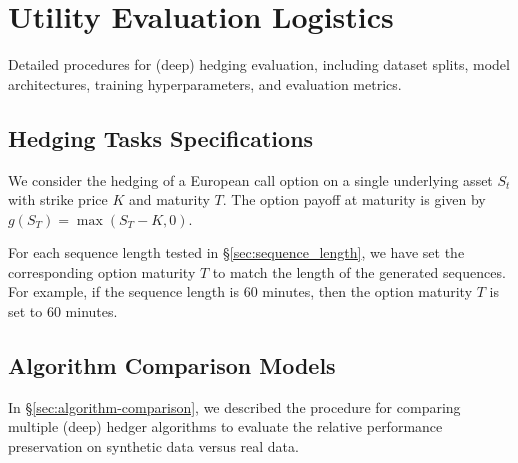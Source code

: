\section{Utility Evaluation Logistics}
  Detailed procedures for (deep) hedging evaluation, including
  dataset splits, model architectures, training hyperparameters,
  and evaluation metrics.

  \subsection{Hedging Tasks Specifications}
    We consider the hedging of a European call option on a single
    underlying asset \( S_t \) with strike price \( K \) and
    maturity \( T \). The option payoff at maturity is given by
    \( g(S_T) = \max(S_T - K, 0) \).

    For each sequence length tested in §\ref{sec:sequence_length},
    we have set the corresponding option maturity \( T \) to match
    the length of the generated sequences. For example, if the
    sequence length is 60 minutes, then the option maturity \( T \)
    is set to 60 minutes.

  \subsection{Algorithm Comparison Models}\label{appendix:deep-hedger-algorithms}
    In §\ref{sec:algorithm-comparison}, we described the procedure
    for comparing multiple (deep) hedger algorithms to evaluate the
    relative performance preservation on synthetic data versus real
    data.
  
